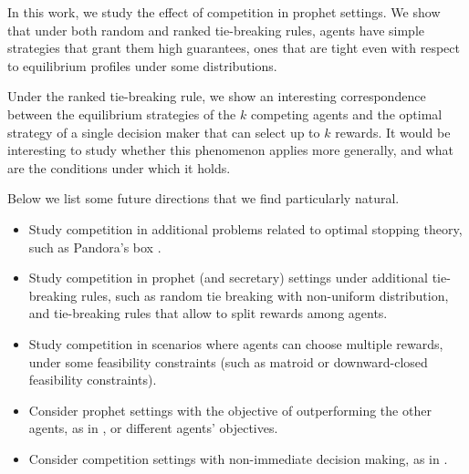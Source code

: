 In this work, we study the effect of competition in prophet settings.
%
We show that under both random and ranked tie-breaking rules, agents have simple strategies that grant them high guarantees, ones that are tight even with respect to equilibrium profiles under some distributions.

Under the ranked tie-breaking rule, we show an interesting correspondence between the equilibrium strategies of the $k$ competing agents and the optimal strategy of a single decision maker that can select up to $k$ rewards. 
It would be interesting to study whether this phenomenon applies more generally, and what are the conditions under which it holds.
 



Below we list some future directions that we find particularly natural. 
\begin{itemize}
	\item Study competition in additional problems related to optimal stopping theory, such as Pandora's box \cite{weitzman1979optimal}.%
	\item Study competition in prophet (and secretary) settings under additional tie-breaking rules, such as random tie breaking with non-uniform distribution, and tie-breaking rules that allow to split rewards among agents.
	\item Study competition in  scenarios where agents can choose multiple rewards, under some feasibility constraints (such as matroid or downward-closed feasibility constraints). 
	\item Consider prophet settings with the objective of outperforming the other agents, as in \cite{immorlica2011dueling}, or different agents' objectives.
	\item Consider competition settings with non-immediate decision making, as in \cite{ezra2020competitive}.
\end{itemize}

